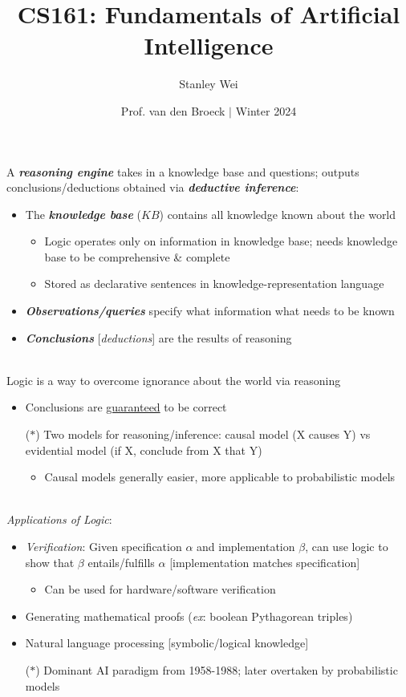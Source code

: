\documentclass[12pt]{extarticle}
\title{CS161: Fundamentals of Artificial Intelligence}
\author{Stanley Wei}
\date{Prof. van den Broeck $\vert$ Winter 2024}
\theoremstyle{definition}
\theoremstyle{remark}
\newcommand{\pstart}[0]{\noindent}
\newcommand{\newp}[0]{~\\ \pstart}
\newcommand{\term}[1]{\noindent\textbf{\textit{#1}}}
\begin{document}
\pstart
A \term{reasoning engine} takes in a knowledge base and questions; outputs conclusions/deductions obtained via \term{deductive inference}: \begin{itemize}
    \item The \term{knowledge base} ($KB$) contains all knowledge known about the world \begin{itemize}
        \item Logic operates only on information in knowledge base; needs knowledge base to be comprehensive \& complete
        \item Stored as declarative sentences in knowledge-representation language
    \end{itemize}
    \item \term{Observations/queries} specify what information what needs to be known
    \item \term{Conclusions} [\textit{deductions}] are the results of reasoning
\end{itemize}

\newp
Logic is a way to overcome ignorance about the world via reasoning \begin{itemize}
    \item Conclusions are \ul{guaranteed} to be correct
    \item[($\ast$)] Two models for reasoning/inference:  causal model (X causes Y) vs evidential model (if X, conclude from X that Y) \begin{itemize}
        \item Causal models generally easier, more applicable to probabilistic models
    \end{itemize}
\end{itemize}

\newp
\textit{Applications of Logic}: \begin{itemize}
    \item \textit{Verification}: Given specification $\alpha$ and implementation $\beta$, can use logic to show that $\beta$ entails/fulfills $\alpha$ [implementation matches specification] \begin{itemize}
        \item Can be used for hardware/software verification
    \end{itemize}
    \item Generating mathematical proofs (\textit{ex}: boolean Pythagorean triples)
    \item Natural language processing [symbolic/logical knowledge]
    \item[($\ast$)] Dominant AI paradigm from 1958-1988; later overtaken by probabilistic models
\end{itemize}
\end{document}
